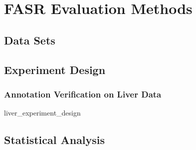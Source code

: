 \chapter{FASR Evaluation Methods}
\section{Data Sets}

\section{Experiment Design}
\subsection{Annotation Verification on Liver Data}
{liver_experiment_design}

\section{Statistical Analysis}
